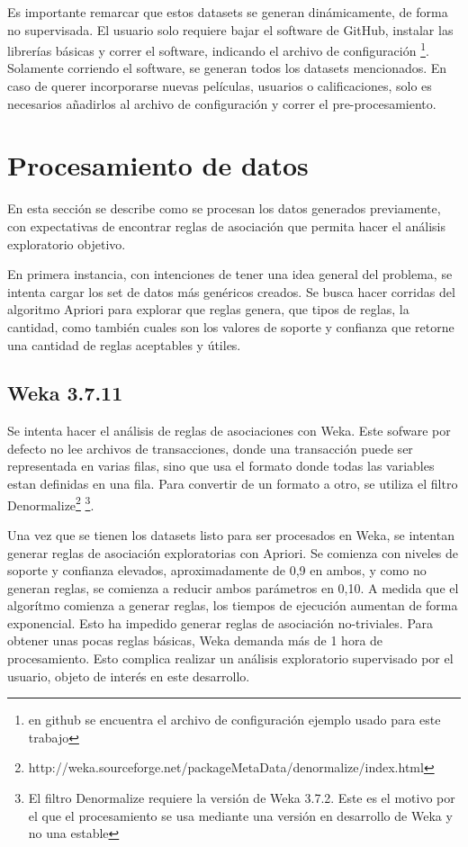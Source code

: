 \documentclass[journal]{IEEEtran}
\begin{document}
Es importante remarcar que estos datasets se generan dinámicamente, de forma 
no supervisada. El usuario solo requiere bajar el software de GitHub, instalar
las librerías básicas y correr el software, indicando el archivo de configuración
\footnote{en github se encuentra el archivo de configuración ejemplo usado para este trabajo}. 
Solamente corriendo el software, se generan todos los datasets mencionados.  En caso de
querer incorporarse nuevas películas, usuarios o calificaciones, solo es necesarios
añadirlos al archivo de configuración y correr el pre-procesamiento.





\section{Procesamiento de datos}
En esta sección se describe como se procesan los datos generados previamente, 
con expectativas de encontrar reglas de asociación que permita hacer el
análisis exploratorio objetivo.

En primera instancia, con intenciones de tener una idea general del problema,
se intenta cargar los set de datos más genéricos creados. Se busca hacer 
corridas del algoritmo Apriori para explorar
que reglas genera, que tipos de reglas, la cantidad, como
también cuales son los valores de soporte y confianza que retorne una cantidad
de reglas aceptables y útiles. 

\subsection{Weka 3.7.11}
Se intenta hacer el análisis de reglas de asociaciones con Weka. Este sofware por defecto
no lee archivos de transacciones, donde una transacción puede ser representada en varias filas,
 sino que usa el formato donde todas las variables estan definidas en una fila. Para convertir
de un formato a otro, se utiliza el filtro 
Denormalize\footnote{http://weka.sourceforge.net/packageMetaData/denormalize/index.html}
\footnote{El filtro Denormalize requiere la versión de Weka 3.7.2. Este es el motivo por el que 
el procesamiento se usa mediante una versión en desarrollo de Weka y no una estable}. 

Una vez que se tienen los datasets listo para ser procesados en Weka, se intentan generar reglas
de asociación exploratorias con Apriori. Se comienza con niveles de soporte y confianza elevados,
aproximadamente de 0,9 en ambos, y como no generan reglas, se comienza a reducir ambos parámetros
en 0,10. A medida que el algorítmo comienza a generar reglas, los tiempos de ejecución aumentan
de forma exponencial. Esto ha impedido generar reglas de asociación no-triviales. Para obtener
unas pocas reglas básicas, Weka demanda más de 1 hora de procesamiento. Esto complica realizar un análisis
exploratorio supervisado por el usuario, objeto de interés en este desarrollo.
\end{document}
